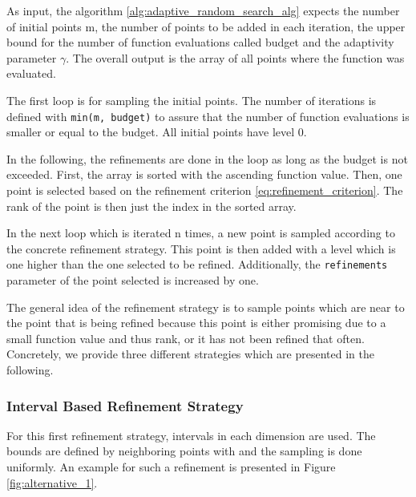 As input, the algorithm \ref{alg:adaptive_random_search_alg} expects the number of initial points m, the number of points to be added in each iteration, the upper bound for the number of function evaluations called budget and the adaptivity parameter $ \gamma $. The overall output is the array of all points where the function was evaluated. 

The first loop is for sampling the initial points. The number of iterations is defined with \texttt{min(m, budget)} to assure that the number of function evaluations is smaller or equal to the budget. All initial points have level 0. 

In the following, the refinements are done in the loop as long as the budget is not exceeded. First, the array is sorted with the ascending function value. Then, one point is selected based on the refinement criterion \ref{eq:refinement_criterion}. The rank of the point is then just the index in the sorted array. 

In the next loop which is iterated n times, a new point is sampled according to the concrete refinement strategy. This point is then added with a level which is one higher than the one selected to be refined. Additionally, the \texttt{refinements} parameter of the point selected is increased by one. \newline 

The general idea of the refinement strategy is to sample points which are near to the point that is being refined because this point is either promising due to a small function value and thus rank, or it has not been refined that often. Concretely, we provide three different strategies which are presented in the following.

\subsubsection{Interval Based Refinement Strategy}

For this first refinement strategy, intervals in each dimension are used. The bounds are defined by neighboring points with and the sampling is done uniformly. An example for such a refinement is presented in Figure \ref{fig:alternative_1}. \newline 

